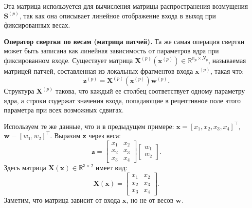 Эта матрица используется для вычисления матрицы распространения возмущения $\mathbf{S}^{(p)}$, так как она описывает линейное отображение входа в выход при фиксированных весах.

\textbf{Оператор свертки по весам (матрица патчей).} Та же самая операция свертки может быть записана как линейная зависимость от параметров ядра при фиксированном входе. Существует матрица $\mathbf{X}^{(p)}\left(\mathbf{x}^{(p)}\right) \in \mathbb{R}^{n_p \times N_p}$, называемая матрицей патчей, составленная из локальных фрагментов входа $\mathbf{x}^{(p)}$, такая что:
\begin{equation}
    \label{eq:cnn-patch-def}
    \mathbf{z}^{(p)} = \mathbf{X}^{(p)}\left(\mathbf{x}^{(p)}\right) \mathbf{w}^{(p)}.
\end{equation}
Структура $\mathbf{X}^{(p)}$ такова, что каждый ее столбец соответствует одному параметру ядра, а строки содержат значения входа, попадающие в рецептивное поле этого параметра при всех возможных сдвигах.

\begin{example}
    Используем те же данные, что и в предыдущем примере: $\mathbf{x} = [x_1, x_2, x_3, x_4]^\top$, $\mathbf{w} = [w_1, w_2]^\top$.
    Выразим $\mathbf{z}$ через веса:
    \[
    \mathbf{z} = 
    \begin{bmatrix}
    x_1 & x_2 \\
    x_2 & x_3 \\
    x_3 & x_4
    \end{bmatrix}
    \begin{bmatrix}
    w_1 \\ w_2
    \end{bmatrix}.
    \]
    Здесь матрица $\mathbf{X}(\mathbf{x}) \in \mathbb{R}^{3 \times 2}$ имеет вид:
    \begin{equation}
    \label{eq:patch-example}
    \mathbf{X}(\mathbf{x}) = 
    \begin{bmatrix}
    x_1 & x_2 \\
    x_2 & x_3 \\
    x_3 & x_4
    \end{bmatrix}.
    \end{equation}
    Заметим, что матрица зависит от входа $\mathbf{x}$, но не от весов $\mathbf{w}$.
\end{example}

